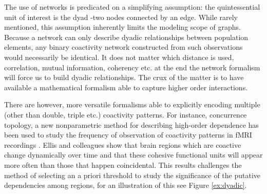 \documentclass[onecollarge,runningheads]{svjour2}
\begin{document}
The use of networks is predicated on a simplifying assumption: the quintessential unit of interest is the dyad -two nodes connected by an edge. While rarely mentioned, this assumption inherently limits the modeling scope of graphs. 
Because a network can only describe dyadic relationships between population elements, any binary coactivity network constructed from such observations would necessarily be identical. It does not matter which distance is used, correlation, mutual information, coherency etc. at the end the network formalism will force us to build dyadic relationships. The crux of the matter is to have available a mathematical formalism able to capture higher order interactions. 





There are however, more versatile formalisms able to explicitly encoding multiple (other than double, triple etc.) coactivity patterns. For instance, concurrence topology, a new nonparametric method for describing high-order dependence has been used to study the frequency of observation of coactivity patterns in fMRI recordings \cite{ellis2014describing}. Ellis and colleagues show that brain regions which are coactive change dynamically over time and that these cohesive functional units will appear more often than those that happen coincidental. This results challenges the method of selecting an a priori threshold to study the significance of the putative dependencies among regions, for an illustration of this see Figure \ref{ex:dyadic}.
\end{document}
